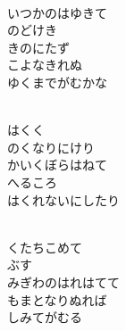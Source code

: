 \documentclass[10pt,b5j]{tarticle} %
\begin{document}
\begin{enumerate}
\begin{minipage}[c]{\blocksize}
    \end{minipage}
    \begin{minipage}[c]{\blocksize}
        
        \vspace{\linespace}
        \item~\\
        いつかのはゆきて\\
        のどけき\\
        きのにたず\\
        こよなきれぬ\\
        ゆくまでがむかな
        
    \end{minipage}
    \begin{minipage}[c]{\blocksize}
        
        \vspace{\linespace}
        \item~\\
        はくく\\
        のくなりにけり\\
        かいくぼらはねて\\
        へるころ\\
        はくれないにしたり
        
    \end{minipage}
    \begin{minipage}[c]{\blocksize}
        
        \vspace{\linespace}
        \item~\\
        くたちこめて\\
        ぶす\\
        みぎわのはれはてて\\
        もまとなりぬれば\\
        しみてがむる
        
    \end{minipage}
    \begin{minipage}[c]{\blocksize}
        

\end{minipage}
\end{enumerate}
\end{document}
